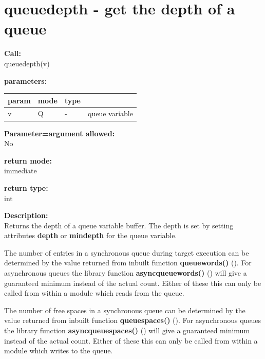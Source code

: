     \section{queuedepth - get the depth of a queue}\label{sec:ifqueuedepth}
        
        {\bf Call:} \\
        queuedepth(v)
        
        {\bf parameters:} \\
        \begin{tabular}{| l | l | l | l |}
        \hline
        param  & mode & type & \\
        \hline \hline
        v & Q & - & queue variable \\ \hline
        \end{tabular}
        
        {\bf Parameter=argument allowed:} \\
        No
        
        {\bf return mode:} \\
        immediate

        {\bf return type:} \\
        int
        
        {\bf Description:} \\
        Returns the depth of a queue variable buffer. The depth is set by setting
        attributes {\bf depth} or {\bf mindepth} for the queue variable.
        
        The number of entries in a synchronous queue during target execution can
        be determined by the value returned from inbuilt function {\bf
        queuewords()} (). For asynchronous queues the
        library function {\bf asyncqueuewords()}
        () will give a guaranteed minimum
        instead of the actual count. Either of these this can only be called
        from within a module which reads from the queue.
        
        The number of free spaces in a synchronous queue can be determined
        by the value returned from inbuilt function {\bf queuespaces()}
        (). For asynchronous queues the
        library function {\bf asyncqueuespaces()}
        () will give a guaranteed minimum
        instead of the actual count. Either of these this can only be called
        from within a module which writes to the queue.
 

